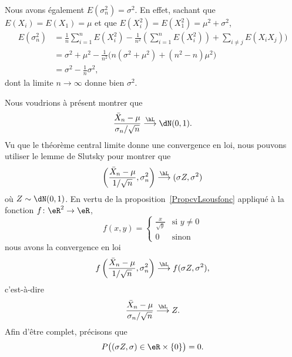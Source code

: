 \begin{example}
    Nous avons également \( E(\sigma_n^2)=\sigma^2\). En effet, sachant que \( E(X_i)=E(X_1)=\mu\) et que \( E(X_i^2)=E(X_1^2)=\mu^2+\sigma^2\),
    \begin{subequations}
        \begin{align}
            E(\sigma_n^2)&=\frac{1}{ n }\sum_{i=1}^nE(X_i^2)-\frac{1}{ n^2 }\left( \sum_{i=1}^nE(X_i^2) \right)+\sum_{i\neq j}E(X_iX_j))\\
            &=\sigma^2+\mu^2-\frac{1}{ n^2 }\big( n(\sigma^2+\mu^2)+(n^2-n)\mu^2 \big)\\
            &=\sigma^2-\frac{1}{ n }\sigma^2,
        \end{align}
    \end{subequations}
    dont la limite \( n\to\infty\) donne bien \( \sigma^2\).

    Nous voudrions à présent montrer que
    \begin{equation}
        \frac{ \bar X_n-\mu }{ \sigma_n/\sqrt{n} }\stackrel{\hL}{\longrightarrow}\dN(0,1).
    \end{equation}
    Vu que le théorème central limite donne une convergence en loi, nous pouvons utiliser le lemme de Slutsky pour montrer que
    \begin{equation}
        \left( \frac{ \bar X_n-\mu }{ 1/\sqrt{n} },\sigma_n^2 \right)\stackrel{\hL}{\longrightarrow}(\sigma Z,\sigma^2)
    \end{equation}
    où \( Z\sim\dN(0,1)\). En vertu de la proposition~\ref{PropcvLsousfonc} appliqué à la fonction \( f\colon \eR^2\to \eR\),
    \begin{equation}
        f(x,y)=\begin{cases}
            \frac{ x }{ \sqrt{y} }    &   \text{si } y\neq 0\\
            0    &    \text{sinon}
        \end{cases}
    \end{equation}
    nous avons la convergence en loi
    \begin{equation}
        f\left( \frac{ \bar X_n-\mu }{ 1/\sqrt{n} },\sigma_n^2 \right)\stackrel{\hL}{\longrightarrow}f(\sigma Z,\sigma^2),
    \end{equation}
    c'est-à-dire
    \begin{equation}
        \frac{ \bar X_n-\mu }{ \sigma_n/\sqrt{n} }\stackrel{\hL}{\longrightarrow}Z.
    \end{equation}
    Afin d'être complet, précisons que
    \begin{equation}
        P\big( (\sigma Z,\sigma)\in\eR\times \{ 0 \} \big)=0.
    \end{equation}
\end{example}

